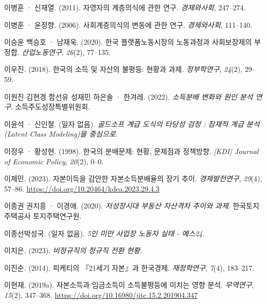 \documentclass[
  letterpaper,
  DIV=11,
  numbers=noendperiod]{scrartcl}
\newlength{\cslhangindent}
\newenvironment{CSLReferences}[2] %
 {\begin{list}{}{%
  \setlength{\itemindent}{0pt}
  \setlength{\leftmargin}{0pt}
  \setlength{\parsep}{0pt}
  \ifodd #1
   \setlength{\leftmargin}{\cslhangindent}
   \setlength{\itemindent}{-1\cslhangindent}
  \fi
  \setlength{\itemsep}{#2\baselineskip}}}
 {\end{list}}
\begin{document}
\begin{CSLReferences}{1}{0}
이병훈 · 신재열. (2011). {자영자의 계층의식에 관한 연구}.
\emph{경제와사회}, 247--274.

이병훈 · 윤정향. (2006). {사회계층의식의 변동에 관한 연구}.
\emph{경제와사회}, 111--140.

이승윤 백승호 · 남재욱. (2020). {한국 플랫폼노동시장의 노동과정과
사회보장제의 부정합}. \emph{산업노동연구}, \emph{26}(2), 77--135.

이우진. (2018). {한국의 소득 및 자산의 불평등: 현황과 과제}.
\emph{정부학연구}, \emph{24}(2), 29--59.

이원진 김현경 함선유 성재민 하은솔 · 한겨레. (2022). \emph{{소득분배
변화와 원인 분석 연구}}. 소득주도성장특별위원회.

이윤석 · 신인철. (일자 없음). \emph{{골드소프 계급 도식의 타당성 검정 :
잠재적 계급 분석(Latent Class Modeling)을 중심으로}}.

이정우 · 황성현. (1998). {한국의 분배문제: 현황, 문제점과 정책방향}.
\emph{{[}KDI{]} Journal of Economic Policy}, \emph{20}(2), 0--0.

이제민. (2023). {자본이득을 감안한 자본소득분배율의 장기 추이}.
\emph{경제발전연구}, \emph{29}(4), 57--86.
\url{https://doi.org/10.20464/kdea.2023.29.4.3}

이종권 권치흥 · 이경애. (2020). \emph{저성장시대 부동산 자산격차 추이와
과제}. 한국토지주택공사 토지주택연구원.

이종선박성국. (일자 없음). \emph{{5인 미만 사업장 노동자 실태 -
예스24}}.

이지은. (2023). \emph{{비정규직의 정규직 전환 현황}}.

이진순. (2014). {피케티의 『21세기 자본』과 한국경제}.
\emph{재정학연구}, \emph{7}(4), 183--217.

이현재. (2019a). {자본소득과 임금소득이 소득불평등에 미치는 영향 분석}.
\emph{무역연구}, \emph{15}(2), 347--368.
\url{https://doi.org/10.16980/jitc.15.2.201904.347}


\end{CSLReferences}
\end{document}
